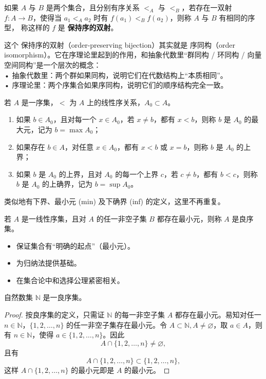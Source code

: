 \begin{definition}[保持序的双射]
如果 $A$ 与 $B$ 是两个集合，且分别有序关系 $<_{A}$ 与 $<_{B}$，若存在一双射 
$f:A \to B$，使得当 $a_{1} <_{A} a_{2}$ 时有 $f(a_{1}) <_{B} f(a_{2})$，则称 $A$ 与 $B$ 有相同的序型，
称这样的 $f$ 是 \textbf{保持序的双射}。
\end{definition}
这个 保持序的双射（order-preserving bijection）其实就是 序同构（order isomorphism）。它在序理论里起到的作用，和抽象代数里“群同构 / 环同构 / 向量空间同构”是一个层次的概念：\\
	•	抽象代数里：两个群如果同构，说明它们在代数结构上“本质相同”。
	\\•	序理论里：两个序集合如果序同构，说明它们的顺序结构完全一致。
\begin{definition}[上确界]
若 $A$ 是一序集，$<$ 为 $A$ 上的线性序关系，$A_0 \subset A$。

\begin{enumerate}
  \item 如果 $b \in A_0$，且对每一个 $x \in A_0$，若 $x \ne b$，都有 $x < b$，则称 $b$ 是 $A_0$ 的最大元，记为 $b = \max A_0$；
  \item 如果存在 $b \in A$，对任意 $x \in A_0$，都有 $x < b$ 或 $x = b$，则称 $b$ 是 $A_0$ 的上界；
  \item 如果 $b$ 是 $A_0$ 的上界，且对 $A_0$ 的每一个上界 $c$，若 $c \ne b$，都有 $b < c$，则称 $b$ 是 $A_0$ 的上确界，记为 $b = \sup A_0$。
\end{enumerate}

类似地有下界、最小元 (min) 及下确界 (inf) 的定义，这里不再重复。
\end{definition}

\begin{definition}[良序集]
若 $A$ 是一线性序集，且对 $A$ 的任一非空子集 $B$ 都存在最小元，则称 $A$ 是良序集。
\end{definition}
\begin{itemize}
  \item 保证集合有“明确的起点”（最小元）。
  \item 为归纳法提供基础。
  \item 在集合论中和选择公理紧密相关。
\end{itemize}
\begin{theorem}[自然数集良序集]
自然数集 $\mathbb{N}$ 是一良序集。
\end{theorem}

\begin{proof}
按良序集的定义，只需证 $\mathbb{N}$ 的每一非空子集 $A$ 都存在最小元。易知对任一 $n \in \mathbb{N}$，$\{1,2,\dots,n\}$ 的任一非空子集存在最小元。令 $A \subset \mathbb{N}, A \neq \varnothing$，取 $a \in A$，则有 $n \in \mathbb{N}$，使得 $a \in \{1,2,\dots,n\}$。因此 
\[
A \cap \{1,2,\dots,n\} \neq \varnothing,
\]
且有
\[
A \cap \{1,2,\dots,n\} \subset \{1,2,\dots,n\},
\]
这样 $A \cap \{1,2,\dots,n\}$ 的最小元即是 $A$ 的最小元。
\end{proof}

